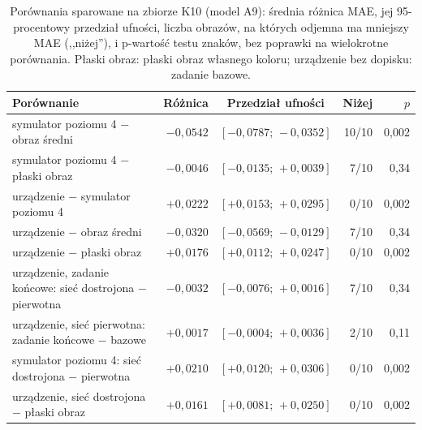 \begin{table}[htbp]
\centering
\caption[Porównania sparowane na zbiorze K10]{Porównania sparowane na zbiorze K10 (model A9): średnia różnica MAE, jej 95-procentowy przedział ufności, liczba obrazów, na których odjemna ma mniejszy MAE (,,niżej''), i p-wartość testu znaków, bez poprawki na wielokrotne porównania. Płaski obraz: płaski obraz własnego koloru; urządzenie bez dopisku: zadanie bazowe.}
\label{tab:le:paired}
\footnotesize
\setlength{\tabcolsep}{4pt}
\begin{tabular}{@{}lrcrr@{}}
\toprule
Porównanie & Różnica & Przedział ufności & Niżej & $p$ \\
\midrule
symulator poziomu 4 $-$ obraz średni & $-0{,}0542$ & $[-0{,}0787;\,-0{,}0352]$ & 10/10 & 0,002 \\
symulator poziomu 4 $-$ płaski obraz & $-0{,}0046$ & $[-0{,}0135;\,+0{,}0039]$ & 7/10 & 0,34 \\
urządzenie $-$ symulator poziomu 4 & $+0{,}0222$ & $[+0{,}0153;\,+0{,}0295]$ & 0/10 & 0,002 \\
urządzenie $-$ obraz średni & $-0{,}0320$ & $[-0{,}0569;\,-0{,}0129]$ & 7/10 & 0,34 \\
urządzenie $-$ płaski obraz & $+0{,}0176$ & $[+0{,}0112;\,+0{,}0247]$ & 0/10 & 0,002 \\
\midrule
urządzenie, zadanie końcowe: sieć dostrojona $-$ pierwotna & $-0{,}0032$ & $[-0{,}0076;\,+0{,}0016]$ & 7/10 & 0,34 \\
urządzenie, sieć pierwotna: zadanie końcowe $-$ bazowe & $+0{,}0017$ & $[-0{,}0004;\,+0{,}0036]$ & 2/10 & 0,11 \\
symulator poziomu 4: sieć dostrojona $-$ pierwotna & $+0{,}0210$ & $[+0{,}0120;\,+0{,}0306]$ & 0/10 & 0,002 \\
urządzenie, sieć dostrojona $-$ płaski obraz & $+0{,}0161$ & $[+0{,}0081;\,+0{,}0250]$ & 0/10 & 0,002 \\
\bottomrule
\end{tabular}
\end{table}
